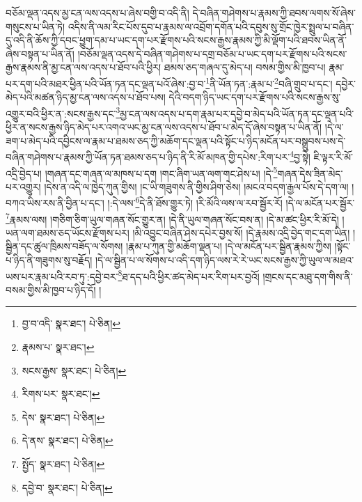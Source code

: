 བཅོམ་ལྡན་འདས་མྱ་ངན་ལས་འདས་པ་ཞེས་བགྱི་བ་འདི་ནི། དེ་བཞིན་གཤེགས་པ་རྣམས་ཀྱི་ཐབས་ལགས་སོ་ཞེས་གསུངས་པ་ཡིན་ཏེ། འདིས་ནི་ལམ་རིང་པོས་དུབ་པ་རྣམས་ལ་འབྲོག་དགོན་པའི་དབུས་སུ་གྲོང་ཁྱེར་སྤྲུལ་པ་བཞིན་དུ་འདི་ནི་ཆོས་ཀྱི་དབང་ཕྱུག་དམ་པ་ཡང་དག་པར་རྫོགས་པའི་སངས་རྒྱས་རྣམས་ཀྱི་མི་ལྡོག་པའི་ཐབས་ཡིན་ནོ་ཞེས་བསྟན་པ་ཡིན་ནོ། །བཅོམ་ལྡན་འདས་དེ་བཞིན་གཤེགས་པ་དགྲ་བཅོམ་པ་ཡང་དག་པར་རྫོགས་པའི་སངས་རྒྱས་རྣམས་ནི་མྱ་ངན་ལས་འདས་པ་ཐོབ་པའི་ཕྱིར། ཐམས་ཅད་གཞལ་དུ་མེད་པ། བསམ་གྱིས་མི་ཁྱབ་པ། རྣམ་པར་དག་པའི་མཐར་ཕྱིན་པའི་ཡོན་ཏན་དང་ལྡན་པའོ་ཞེས་:བྱ་བ་\footnote{བྱ་བ་འདི་  སྣར་ཐང་།  པེ་ཅིན། }ནི་ཡོན་ཏན་:རྣམ་པ་\footnote{རྣམས་པ་  སྣར་ཐང་། }བཞི་གྲུབ་པ་དང་། དབྱེར་མེད་པའི་མཚན་ཉིད་མྱ་ངན་ལས་འདས་པ་ཐོབ་པས། དེའི་བདག་ཉིད་ཡང་དག་པར་རྫོགས་པའི་སངས་རྒྱས་སུ་འགྱུར་བའི་ཕྱིར་ན་:སངས་རྒྱས་དང་\footnote{སངས་རྒྱས་  སྣར་ཐང་།  པེ་ཅིན། }མྱ་ངན་ལས་འདས་པ་དག་རྣམ་པར་དབྱེ་བ་མེད་པའི་ཡོན་ཏན་དང་ལྡན་པའི་ཕྱིར་ན་སངས་རྒྱས་ཉིད་མེད་པར་འགའ་ཡང་མྱ་ངན་ལས་འདས་པ་ཐོབ་པ་མེད་དོ་ཞེས་བསྟན་པ་ཡིན་ནོ། །དེ་ལ་ཟག་པ་མེད་པའི་དབྱིངས་ལ་རྣམ་པ་ཐམས་ཅད་ཀྱི་མཆོག་དང་ལྡན་པའི་སྟོང་པ་ཉིད་མངོན་པར་བསྒྲུབས་པས་དེ་བཞིན་གཤེགས་པ་རྣམས་ཀྱི་ཡོན་ཏན་ཐམས་ཅད་པ་ཉིད་ནི་རི་མོ་མཁན་གྱི་དཔེས་:རིག་པར་\footnote{རིགས་པར་  སྣར་ཐང་། }བྱ་སྟེ། ཇི་ལྟར་རི་མོ་འདྲི་བྱེད་པ། །གཞན་དང་གཞན་ལ་མཁས་པ་དག །གང་ཞིག་ཡན་ལག་གང་ཤེས་པ། །དེ་\footnote{དེས་  སྣར་ཐང་།  པེ་ཅིན། }གཞན་དེས་ཟིན་མེད་པར་འགྱུར། །དེས་ན་འདི་ལ་ཁྱེད་ཀུན་གྱིས། །ང་ཡི་གཟུགས་ནི་གྱིས་ཤིག་ཅེས། །མངའ་བདག་རྒྱལ་པོས་དེ་དག་ལ། །བཀའ་ཡིས་རས་ནི་བྱིན་པ་དང་། །:དེ་ལས་\footnote{དེ་ནས་  སྣར་ཐང་།  པེ་ཅིན། }དེ་ནི་ཐོས་གྱུར་ཏེ། །རི་མོའི་ལས་ལ་རབ་སྦྱོར་རོ། །དེ་ལ་མངོན་པར་སྦྱོར་\footnote{སྤྱོད་  སྣར་ཐང་།  པེ་ཅིན། }རྣམས་ལས། །གཅིག་ཅིག་ཡུལ་གཞན་སོང་གྱུར་ན། །དེ་ནི་ཡུལ་གཞན་སོང་བས་ན། །དེ་མ་ཚང་ཕྱིར་རི་མོ་དེ། །ཡན་ལག་ཐམས་ཅད་ཡོངས་རྫོགས་པར། །མི་འབྱུང་བཞིན་ཤེས་དཔེར་བྱས་སོ། །དེ་རྣམས་འདྲི་བྱེད་གང་དག་ཡིན། །སྦྱིན་དང་ཚུལ་ཁྲིམས་བཟོད་ལ་སོགས། །རྣམ་པ་ཀུན་གྱི་མཆོག་ལྡན་པ། །དེ་ལ་མངོན་པར་སྦྱིན་རྣམས་ཀྱིས། །སྟོང་པ་ཉིད་ནི་གཟུགས་སུ་བརྗོད། །དེ་ལ་སྦྱིན་པ་ལ་སོགས་པ་འདི་དག་ཉིད་ལས་རེ་རེ་ཡང་སངས་རྒྱས་ཀྱི་ཡུལ་ལ་མཐའ་ཡས་པར་རྣམ་པའི་རབ་ཏུ་:དབྱེ་བར་\footnote{དབྱེ་བ་  སྣར་ཐང་།  པེ་ཅིན། }ཐ་དད་པའི་ཕྱིར་ཚད་མེད་པར་རིག་པར་བྱའོ། །གྲངས་དང་མཐུ་དག་གིས་ནི་བསམ་གྱིས་མི་ཁྱབ་པ་ཉིད་དོ། །

